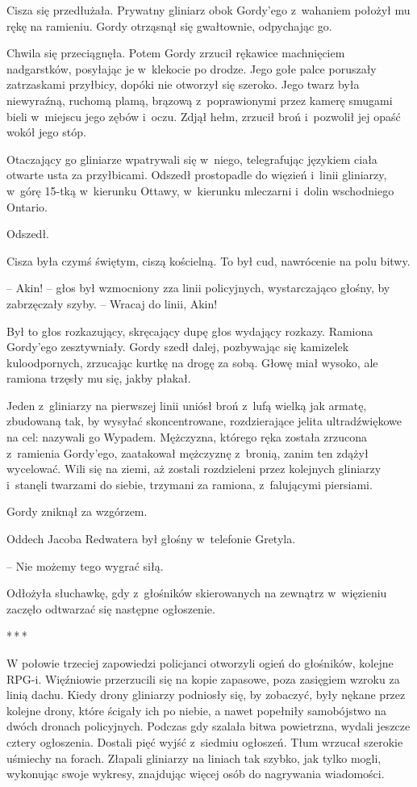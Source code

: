 \documentclass[oneside,polish,11pt,sfheadings]{mwbk}
\newcommand{\threeast}{\bigskip\par\centerline{*\,*\,*}\medskip\par}
\begin{document}
Cisza się przedłużała. Prywatny gliniarz obok Gordy'ego z~wahaniem
położył mu rękę na ramieniu. Gordy otrząsnął się gwałtownie, odpychając
go.

Chwila się przeciągnęła. Potem Gordy zrzucił rękawice machnięciem
nadgarstków, posyłając je w~klekocie po drodze. Jego gołe palce
poruszały zatrzaskami przyłbicy, dopóki nie otworzył się szeroko. Jego
twarz była niewyraźną, ruchomą plamą, brązową z~poprawionymi przez
kamerę smugami bieli w~miejscu jego zębów i~oczu. Zdjął hełm, zrzucił
broń i~pozwolił jej opaść wokół jego stóp.

Otaczający go gliniarze wpatrywali się w~niego, telegrafując językiem
ciała otwarte usta za przyłbicami. Odszedł prostopadle do więzień i~linii gliniarzy, w~górę 15-tką w~kierunku Ottawy, w~kierunku mleczarni i~dolin wschodniego Ontario.

Odszedł.

Cisza była czymś świętym, ciszą kościelną. To był cud, nawrócenie na
polu bitwy.

-- Akin! -- głos był wzmocniony zza linii policyjnych, wystarczająco
głośny, by zabrzęczały szyby. -- Wracaj do linii, Akin! 

Był to głos rozkazujący, skręcający dupę głos wydający rozkazy. Ramiona Gordy'ego
zesztywniały. Gordy szedł dalej, pozbywając się kamizelek kuloodpornych,
zrzucając kurtkę na drogę za sobą. Głowę miał wysoko, ale ramiona
trzęsły mu się, jakby płakał.

Jeden z~gliniarzy na pierwszej linii uniósł broń z~lufą wielką jak
armatę, zbudowaną tak, by wysyłać skoncentrowane, rozdzierające jelita
ultradźwiękowe na cel: nazywali go Wypadem. Mężczyzna, którego ręka
została zrzucona z~ramienia Gordy'ego, zaatakował mężczyznę z~bronią,
zanim ten zdążył wycelować. Wili się na ziemi, aż zostali rozdzieleni
przez kolejnych gliniarzy i~stanęli twarzami do siebie, trzymani za
ramiona, z~falującymi piersiami.

Gordy zniknął za wzgórzem.

Oddech Jacoba Redwatera był głośny w~telefonie Gretyla.

-- Nie możemy tego wygrać siłą. 

Odłożyła słuchawkę, gdy z~głośników
skierowanych na zewnątrz w~więzieniu zaczęło odtwarzać się następne
ogłoszenie.

\threeast

W połowie trzeciej zapowiedzi policjanci otworzyli ogień do głośników,
kolejne RPG-i. Więźniowie przerzucili się na kopie zapasowe, poza
zasięgiem wzroku za linią dachu. Kiedy drony gliniarzy podniosły się, by
zobaczyć, były nękane przez kolejne drony, które ścigały ich po niebie,
a nawet popełniły samobójstwo na dwóch dronach policyjnych. Podczas gdy
szalała bitwa powietrzna, wydali jeszcze cztery ogłoszenia. Dostali pięć
wyjść z~siedmiu ogłoszeń. Tłum wrzucał szerokie uśmiechy na forach.
Złapali gliniarzy na liniach tak szybko, jak tylko mogli, wykonując
swoje wykresy, znajdując więcej osób do nagrywania wiadomości.
\end{document}
